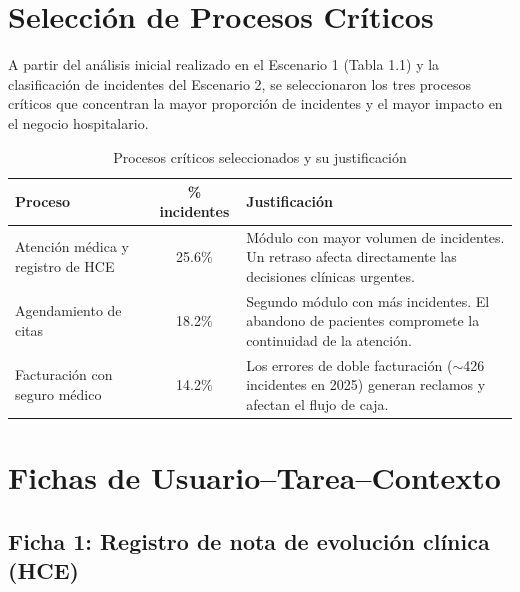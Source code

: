 \documentclass[12pt,a4paper]{article}
\begin{document}
\section{Selecci\'on de Procesos Cr\'iticos}

A partir del an\'alisis inicial realizado en el Escenario 1 (Tabla 1.1) y la clasificaci\'on de incidentes del Escenario 2, se seleccionaron los tres procesos cr\'iticos que concentran la mayor proporci\'on de incidentes y el mayor impacto en el negocio hospitalario.

\begin{table}[H]
\centering
\caption{Procesos cr\'iticos seleccionados y su justificaci\'on}
\begin{tabularx}{\textwidth}{l c X}
\toprule
\textbf{Proceso} & \textbf{\% incidentes} & \textbf{Justificaci\'on} \\
\midrule
Atenci\'on m\'edica y registro de HCE & 25.6\% & M\'odulo con mayor volumen de incidentes. Un retraso afecta directamente las decisiones cl\'inicas urgentes. \\
Agendamiento de citas & 18.2\% & Segundo m\'odulo con m\'as incidentes. El abandono de pacientes compromete la continuidad de la atenci\'on. \\
Facturaci\'on con seguro m\'edico & 14.2\% & Los errores de doble facturaci\'on ($\sim$426 incidentes en 2025) generan reclamos y afectan el flujo de caja. \\
\bottomrule
\end{tabularx}
\end{table}

\section{Fichas de Usuario--Tarea--Contexto}

\subsection{Ficha 1: Registro de nota de evoluci\'on cl\'inica (HCE)}
\end{document}
